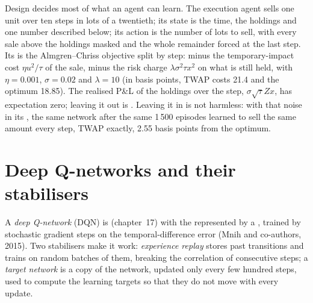 Design decides most of what an agent can learn. The execution agent sells one unit over ten steps in lots of a twentieth;
its state is the time, the holdings and one number described below; its action is the number of lots to sell, with every
sale above the holdings masked and the whole remainder forced at the last step. Its  is the Almgren--Chriss objective
split by step: minus the temporary-impact cost $\eta u^2/\tau$ of the sale, minus the risk charge $\lambda\sigma^2\tau x^2$ on
what is still held, with $\eta = 0.001$, $\sigma = 0.02$ and $\lambda = 10$ (in basis points, TWAP costs 21.4 and the optimum
18.85). The realised P\&L of the holdings over the step, $\sigma\sqrt\tau Z x$, has expectation zero; leaving it out is
. Leaving it in is not harmless: with that noise in its , the same network after the same 1\,500
episodes learned to sell the same amount every step, TWAP exactly, 2.55 basis points from the optimum.

\section{Deep Q-networks and their stabilisers}

\begin{definition}\label{def:ml:reinforcement-learning-for-execution-and-market-making:dqn}
A \emph{deep Q-network} (DQN) is  (chapter~17) with the  represented by
a , trained by stochastic gradient steps on the temporal-difference error (Mnih and co-authors, 2015). Two
stabilisers make it work: \emph{experience replay} stores past transitions and trains on random
batches of them, breaking the correlation of consecutive steps; a \emph{target network} is a copy of the
network, updated only every few hundred steps, used to compute the learning targets so that they do not move with every
update.
\end{definition}

